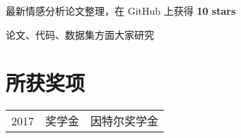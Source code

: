 \documentclass[]{deedy-resume-openfont}
\begin{document}
\begin{minipage}[t]{0.68\textwidth}





%
%





\begin{tightemize}
    \item 最新情感分析论文整理，在 GitHub 上获得 \textbf{10 stars}
    \item 论文、代码、数据集方面大家研究
    \end{tightemize}
\sectionsep


% 
% 



\section{所获奖项} 
\begin{tabular}{rll}
2017         & 奖学金  & 因特尔奖学金 \\

\end{tabular}
\sectionsep




\end{minipage}
\end{document}
